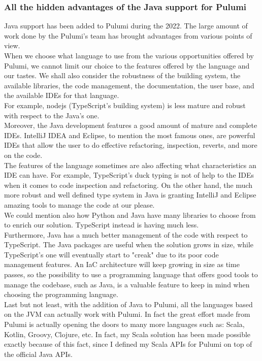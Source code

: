\subsubsection{All the hidden advantages of the Java support for Pulumi}
Java support has been added to Pulumi during the 2022.
The large amount of work done by the Pulumi's team has brought advantages from various points of view.\\
When we choose what language to use from the various opportunities offered by Pulumi, we cannot limit our choice to the features offered by the language and our tastes.
We shall also consider the robustness of the building system, the available libraries, the code management, the documentation, the user base, and the available IDEs for that language.\\
For example, nodejs (TypeScript's building system) is less mature and robust with respect to the Java's one.\\
Moreover, the Java development features a good amount of mature and complete IDEs.
IntelliJ IDEA and Eclipse, to mention the most famous ones, are powerful IDEs that allow the user to do effective refactoring, inspection, reverts, and more on the code.\\
The features of the language sometimes are also affecting what characteristics an IDE can have.
For example, TypeScript's duck typing is not of help to the IDEs when it comes to code inspection and refactoring.
On the other hand, the much more robust and well defined type system in Java is granting IntelliJ and Eclipse amazing tools to manage the code at our please.\\
We could mention also how Python and Java have many libraries to choose from to enrich our solution.
TypeScript instead is having much less.\\
Furthermore, Java has a much better management of the code with respect to TypeScript.
The Java packages are useful when the solution grows in size, while TypeScript's one will eventually start to "creak" due to its poor code management features.
An IaC architecture will keep growing in size as time passes, so the possibility to use a programming language that offers good tools to manage the codebase, such as Java, is a valuable feature to keep in mind when choosing the programming language.\\
Last but not least, with the addition of Java to Pulumi, all the languages based on the JVM can actually work with Pulumi.
In fact the great effort made from Pulumi is actually opening the doors to many more languages such as: Scala, Kotlin, Groovy, Clojure, etc.
In fact, my Scala solution has been made possible exactly because of this fact, since I defined my Scala APIs for Pulumi on top of the official Java APIs.


